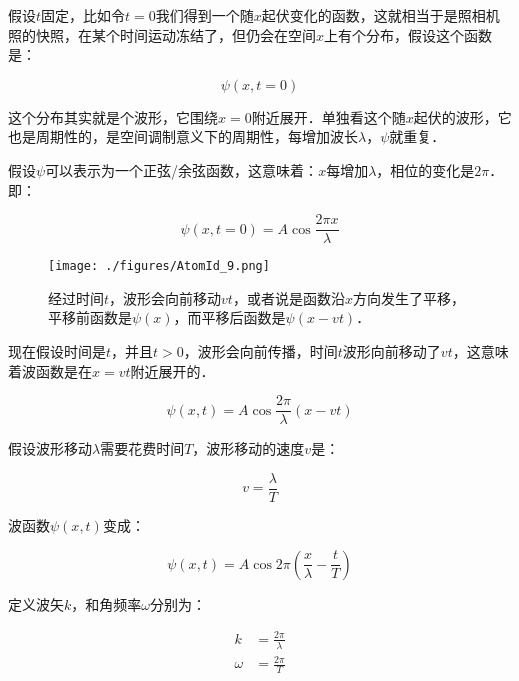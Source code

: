 假设$t$固定，比如令$t = 0$我们得到一个随$x$起伏变化的函数，这就相当于是照相机照的快照，在某个时间运动冻结了，但仍会在空间$x$上有个分布，假设这个函数是：

\begin{equation}
\psi (x, t = 0) 
\end{equation}

这个分布其实就是个波形，它围绕$x = 0$附近展开．单独看这个随$x$起伏的波形，它也是周期性的，是空间调制意义下的周期性，每增加波长$\lambda$，$\psi$就重复．

假设$\psi$可以表示为一个正弦/余弦函数，这意味着：$x$每增加$\lambda$，相位的变化是$2 \pi$．即：

\begin{equation}
\psi (x, t = 0) = A \cos \frac{2 \pi x}{ \lambda}
\end{equation}

\begin{figure}[ht]
\centering
\texttt{[image: ./figures/AtomId\_9.png]}
\caption{经过时间$t$，波形会向前移动$vt$，或者说是函数沿$x$方向发生了平移，平移前函数是$\psi(x)$，而平移后函数是$\psi(x - vt)$．} \label{AtomId_fig9}
\end{figure}

现在假设时间是$t$，并且$t > 0$，波形会向前传播，时间$t$波形向前移动了$vt$，这意味着波函数是在$x = vt$附近展开的．

\begin{equation}
\psi(x,t) = A \cos \frac{2 \pi}{\lambda} \left( x - vt \right)
\end{equation}

假设波形移动$\lambda$需要花费时间$T$，波形移动的速度$v$是：

\begin{equation}
v = \frac{\lambda}{ T }
\end{equation}

波函数$\psi(x,t)$变成：

\begin{equation}
\psi(x, t) = A \cos   2\pi \left(  \frac{x}{\lambda} - \frac{t}{T}   \right)
\end{equation}

定义波矢$k$，和角频率$\omega$分别为：

\begin{equation}
\begin{aligned}
k &= \frac{2 \pi}{\lambda} \\
\omega &= \frac{2 \pi}{T}
\end{aligned}
\end{equation}

